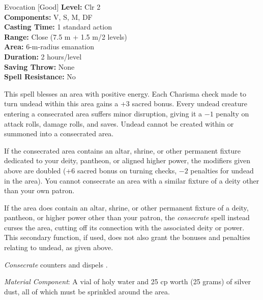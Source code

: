 {Evocation [Good]}
{
	\textbf{Level:}
	Clr 2\\
	\textbf{Components:}
	V, S, M, DF\\
	\textbf{Casting Time:}
	1 standard action\\
	\textbf{Range:}
	Close (7.5 m + 1.5 m/2 levels)\\
	\textbf{Area:}
	6-m-radius emanation\\
	\textbf{Duration:}
	2 hours/level\\
	\textbf{Saving Throw:}
	None\\
	\textbf{Spell Resistance:}
	No\\
}
{
	This spell blesses an area with positive energy. Each Charisma check made to turn undead within this area gains a +3 sacred bonus. Every undead creature entering a consecrated area suffers minor disruption, giving it a $-1$ penalty on attack rolls, damage rolls, and saves. Undead cannot be created within or summoned into a consecrated area.

	If the consecrated area contains an altar, shrine, or other permanent fixture dedicated to your deity, pantheon, or aligned higher power, the modifiers given above are doubled (+6 sacred bonus on turning checks, $-2$ penalties for undead in the area). You cannot consecrate an area with a similar fixture of a deity other than your own patron.

	If the area does contain an altar, shrine, or other permanent fixture of a deity, pantheon, or higher power other than your patron, the \emph{consecrate} spell instead curses the area, cutting off its connection with the associated deity or power. This secondary function, if used, does not also grant the bonuses and penalties relating to undead, as given above.

	\emph{Consecrate} counters and dispels .

	\textit{Material Component}:
	A vial of holy water and 25 cp worth (25 grams) of silver dust, all of which must be sprinkled around the area.

}
